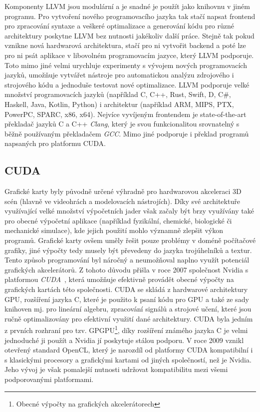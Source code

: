 Komponenty LLVM jsou modulární a je snadné je použít jako knihovnu v jiném programu. Pro vytvoření nového programovacího jazyka tak stačí napsat frontend pro zpracování syntaxe a veškeré optimalizace a generování kódu pro různé architektury poskytne LLVM bez nutnosti jakékoliv další práce. Stejně tak pokud vznikne nová hardwarová architektura, stačí pro ni vytvořit backend a poté lze pro ni psát aplikace v libovolném programovacím jazyce, který LLVM podporuje. Toto mimo jiné velmi urychluje experimenty s vývojem nových programovacích jazyků, umožňuje vytvářet nástroje pro automatickou analýzu zdrojového i strojového kódu a jednoduše testovat nové optimalizace.
LLVM podporuje velké množství programovacích jazyků (například C, C++, Rust, Swift, D, C\#, Haskell, Java, Kotlin, Python) i architektur (například ARM, MIPS, PTX, PowerPC, SPARC, x86, x64). Nejvíce vyvíjeným frontendem je state-of-the-art překladač jazyků C a C++ \emph{Clang}, který je svou funkcionalitou srovnatelný s běžně používaným překladačem \emph{GCC}. Mimo jiné podporuje i překlad programů napsaných pro platformu CUDA.

\subsection{CUDA}
Grafické karty byly původně určené výhradně pro hardwarovou akceleraci 3D scén (hlavně ve videohrách a modelovacích nástrojích). Díky své architektuře využívající velké množství výpočetních jader však začaly být brzy využívány také pro obecné výpočetní aplikace (například fyzikální, chemické, biologické či mechanické simulace), kde jejich použití mohlo významně zlepšit výkon programů. Grafické karty ovšem uměly řešit pouze problémy v doméně počítačové grafiky, jiné výpočty tedy musely být převedeny do jazyka trojúhelníků a textur. Tento způsob programování byl náročný a neumožňoval naplno využít potenciál grafických akcelerátorů. Z tohoto důvodu přišla v roce 2007 společnost Nvidia s platformou \emph{CUDA}~\cite{cuda}, která umožňuje efektivně provádět obecné výpočty na grafických kartách této společnosti. CUDA se skládá z hardwarové architektury GPU, rozšíření jazyka C, které je použito k psaní kódu pro GPU a také ze sady knihoven mj. pro lineární algebru, zpracování signálů a strojové učení, které jsou ručně optimalizovány pro efektivní využití dané architektury. CUDA byla jedním z prvních rozhraní pro tzv. GPGPU\footnote{Obecné výpočty na grafických akcelerátorech}, díky rozšíření známého jazyka C je velmi jednoduché ji použít a Nvidia jí poskytuje stálou podporu. V roce 2009 vznikl otevřený standard OpenCL, který je narozdíl od platformy CUDA kompatibilní i s klasickými procesory a grafickými kartami od jiných společností, než je Nvidia. Jeho vývoj je však pomalejší nutnosti udržovat kompatibilitu mezi všemi podporovanými platformami.

